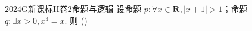
\begin{problem}{2024}{G}{新课标II卷}{2}{命题与逻辑}
设命题 $p: \forall x\in\mathbf{R}, |x+1|>1$；命题 $q: \exists x>0, x^3=x$. 则
(\hspace{1cm})
\begin{choices}
\end{choices}
\end{problem}